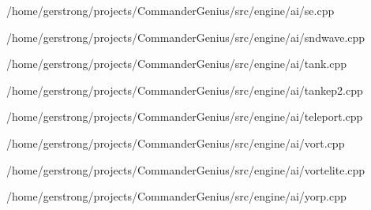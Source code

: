 \begin{DoxyCompactItemize}
/home/gerstrong/projects/CommanderGenius/src/engine/ai/se.cpp\item 
/home/gerstrong/projects/CommanderGenius/src/engine/ai/sndwave.cpp\item 
/home/gerstrong/projects/CommanderGenius/src/engine/ai/tank.cpp\item 
/home/gerstrong/projects/CommanderGenius/src/engine/ai/tankep2.cpp\item 
/home/gerstrong/projects/CommanderGenius/src/engine/ai/teleport.cpp\item 
/home/gerstrong/projects/CommanderGenius/src/engine/ai/vort.cpp\item 
/home/gerstrong/projects/CommanderGenius/src/engine/ai/vortelite.cpp\item 
/home/gerstrong/projects/CommanderGenius/src/engine/ai/yorp.cpp\end{DoxyCompactItemize}
